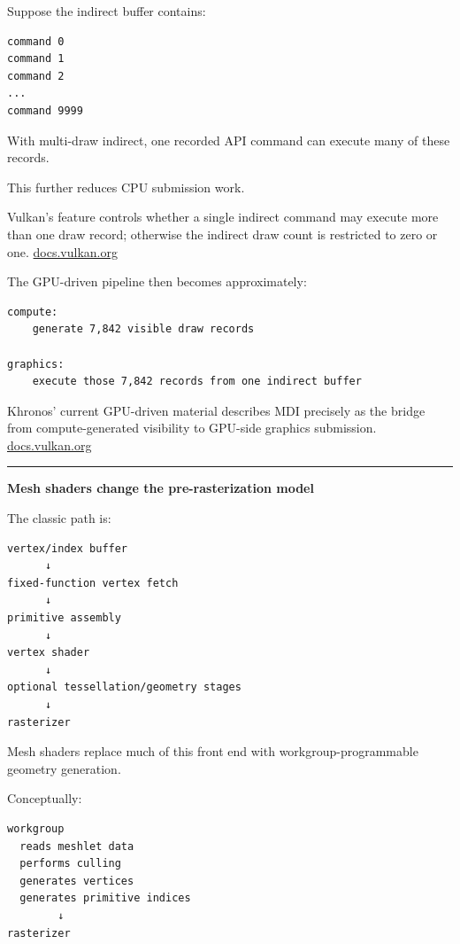 Suppose the indirect buffer contains:

\begin{verbatim}
command 0
command 1
command 2
...
command 9999
\end{verbatim}

With multi-draw indirect, one recorded API command can execute many of these records.

This further reduces CPU submission work.

Vulkan's  feature controls whether a single indirect command may execute more than one draw record; otherwise the indirect draw count is restricted to zero or one. \href{https://docs.vulkan.org/spec/latest/chapters/features.html?utm_source=chatgpt.com}{docs.vulkan.org}

The GPU-driven pipeline then becomes approximately:

\begin{verbatim}
compute:
    generate 7,842 visible draw records

graphics:
    execute those 7,842 records from one indirect buffer
\end{verbatim}

Khronos' current GPU-driven material describes MDI precisely as the bridge from compute-generated visibility to GPU-side graphics submission. \href{https://docs.vulkan.org/samples/latest/samples/performance/multi_draw_indirect/README.html?utm_source=chatgpt.com}{docs.vulkan.org}

\begin{center}\rule{0.5\linewidth}{0.5pt}\end{center}

\textbf{Mesh shaders change the pre-rasterization model}

The classic path is:

\begin{verbatim}
vertex/index buffer
      ↓
fixed-function vertex fetch
      ↓
primitive assembly
      ↓
vertex shader
      ↓
optional tessellation/geometry stages
      ↓
rasterizer
\end{verbatim}

Mesh shaders replace much of this front end with workgroup-programmable geometry generation.

Conceptually:

\begin{verbatim}
workgroup
  reads meshlet data
  performs culling
  generates vertices
  generates primitive indices
        ↓
rasterizer
\end{verbatim}

